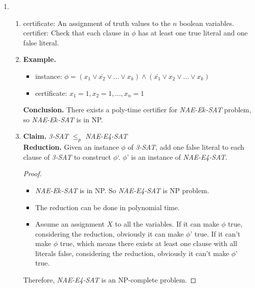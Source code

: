 \documentclass[12pt,a4paper]{article}
\makeatletter
\newtheorem*{solution}{Solution}
\theoremstyle{definition}
\renewenvironment{solution}[1][Solution] {\par\pushQED{\qed}\normalfont\topsep6\p@\@plus6\p@\relax\trivlist\item[\hskip\labelsep\bfseries#1\@addpunct{.}]\ignorespaces}{\popQED\endtrivlist\@endpefalse} \makeatother
\makeatother
\begin{document}
\begin{enumerate}
    \begin{solution}
    \quad \\
    \begin{enumerate}
    	\item certificate: An assignment of truth values to the $n$ boolean variables. \\
    	certifier: Check that each clause in $\phi$ has at least one true literal and one false literal. 
    	
    	\item \textbf{Example.}
    	\begin{itemize}
    		\item instance: $\phi = (x_1 \vee \bar{x_2} \vee ... \vee x_k)\wedge (\bar{x_1} \vee x_2 \vee ... \vee x_k)$
    		\item certificate: $x_1 = 1, x_2 = 1,..., x_n = 1$
    	\end{itemize}
    	\textbf{Conclusion.} There exists a poly-time certifier for \textit{NAE-E$k$-SAT} problem, so \textit{NAE-E$k$-SAT} is in NP. 
    	
    	\item \textbf{Claim.} \textit{3-SAT} $\leq _p$ \textit{NAE-E4-SAT} \\
    	\textbf{Reduction.} Given an instance $\phi$ of \textit{3-SAT}, add one false literal to each clause of \textit{3-SAT} to construct $\phi$`. $\phi$' is an instance of \textit{NAE-E4-SAT}.
    	\begin{proof}
    		\begin{itemize}
    			\item \textit{NAE-E$k$-SAT} is in NP. So \textit{NAE-E4-SAT} is NP problem.
    			\item The reduction can be done in polynomial time. 
    			\item Assume an assignment $X$ to all the variables. If it can make $\phi$ true, considering the reduction, obviously it can make $\phi$' true. If it can't make $\phi$ true, which means there exists at least one clause with all literals false, considering the reduction, obviously it can't make $\phi$' true.   
    		\end{itemize}
 			Therefore, \textit{NAE-E4-SAT} is an NP-complete problem. 
    	\end{proof}
    	

\end{enumerate}
\end{solution}
\end{enumerate}
\end{document}
